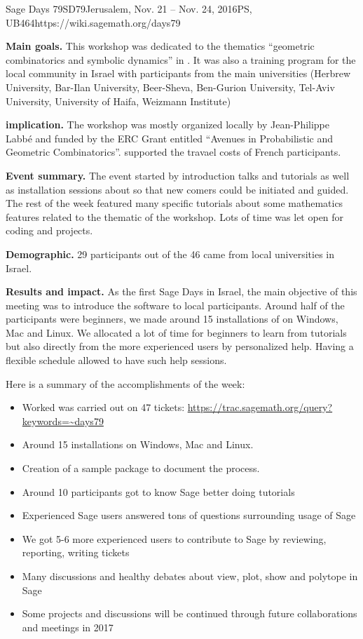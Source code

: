 \begin{event}{Sage Days 79}{SD79}{Jerusalem, Nov. 21 -- Nov. 24, 2016}{PS, UB}{46}{4}{https://wiki.sagemath.org/days79}

\textbf{Main goals.} This workshop was dedicated to the thematics ``geometric combinatorics and symbolic dynamics'' in \Sage. It was also a training program
for the local community in Israel with participants from the main universities (Herbrew University, Bar-Ilan University, Beer-Sheva, Ben-Gurion University, Tel-Aviv University, University of Haifa, Weizmann Institute)

\textbf{\ODK implication.} The workshop was mostly organized locally by Jean-Philippe Labbé and funded by the ERC Grant entitled ``Avenues in Probabilistic and Geometric Combinatorics''. \ODK supported the travael costs of French participants.

\textbf{Event summary.} The event started by introduction talks and tutorials as well as installation sessions about \Sage so that new comers could be initiated and guided. The rest of the week featured many specific tutorials about some mathematics features related to the thematic of the workshop. Lots of time was let open for coding and projects.

\textbf{Demographic.} 29 participants out of the 46 came from local universities in Israel.

\textbf{Results and impact.} As the first Sage Days in Israel, the main objective of this meeting was to introduce the software to local participants. Around half of the participants were beginners, we made around 15 installations of \Sage on Windows, Mac and Linux. We allocated a lot of time for beginners to learn from tutorials but also directly from the more experienced users by personalized help. Having a flexible schedule allowed to have such help sessions.

Here is a summary of the accomplishments of the week:

\begin{itemize}
    \item    Worked was carried out on 47 \Sage tickets: \url{https://trac.sagemath.org/query?keywords=~days79}
    \item    Around 15 installations on Windows, Mac and Linux.
    \item    Creation of a sample \Sage package to document the process.
    \item    Around 10 participants got to know Sage better doing tutorials
    \item    Experienced Sage users answered tons of questions surrounding usage of Sage
    \item    We got 5-6 more experienced users to contribute to Sage by reviewing, reporting, writing tickets
    \item    Many discussions and healthy debates about view, plot, show and polytope in Sage
    \item    Some projects and discussions will be continued through future collaborations and meetings in 2017
\end{itemize}


\end{event}
